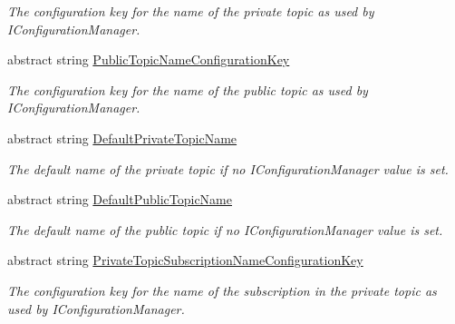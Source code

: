 \begin{DoxyCompactItemize}
\begin{DoxyCompactList}\small\item\em The configuration key for the name of the private topic as used by I\+Configuration\+Manager. \end{DoxyCompactList}\item 
abstract string \hyperlink{classCqrs_1_1Azure_1_1ServiceBus_1_1AzureServiceBus_aec01ea2e2fb686bb3c9ff04f4d337ed6_aec01ea2e2fb686bb3c9ff04f4d337ed6}{Public\+Topic\+Name\+Configuration\+Key}
\begin{DoxyCompactList}\small\item\em The configuration key for the name of the public topic as used by I\+Configuration\+Manager. \end{DoxyCompactList}\item 
abstract string \hyperlink{classCqrs_1_1Azure_1_1ServiceBus_1_1AzureServiceBus_a1fb185ed8605b1f985e4c108ff906b93_a1fb185ed8605b1f985e4c108ff906b93}{Default\+Private\+Topic\+Name}
\begin{DoxyCompactList}\small\item\em The default name of the private topic if no I\+Configuration\+Manager value is set. \end{DoxyCompactList}\item 
abstract string \hyperlink{classCqrs_1_1Azure_1_1ServiceBus_1_1AzureServiceBus_a1119f77ee8c51a575217466046f282a9_a1119f77ee8c51a575217466046f282a9}{Default\+Public\+Topic\+Name}
\begin{DoxyCompactList}\small\item\em The default name of the public topic if no I\+Configuration\+Manager value is set. \end{DoxyCompactList}\item 
abstract string \hyperlink{classCqrs_1_1Azure_1_1ServiceBus_1_1AzureServiceBus_adb82030e0e3ba17347e7fd6a2c68fc91_adb82030e0e3ba17347e7fd6a2c68fc91}{Private\+Topic\+Subscription\+Name\+Configuration\+Key}
\begin{DoxyCompactList}\small\item\em The configuration key for the name of the subscription in the private topic as used by I\+Configuration\+Manager. \end{DoxyCompactList}\item 

\end{DoxyCompactItemize}
